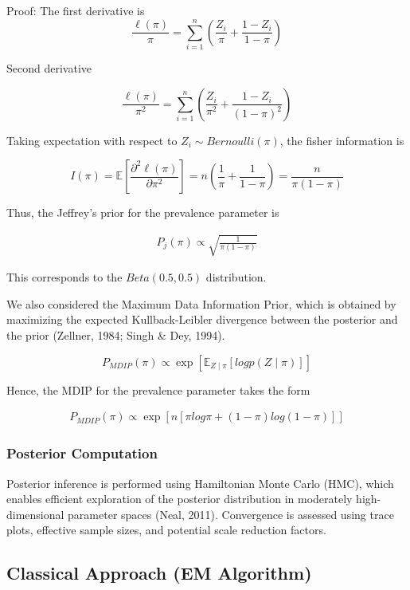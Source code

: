 \documentclass[11pt]{article}
\begin{document}
Proof: The first derivative is 
\[
\frac{\ell(\pi)}{\pi} = \sum_{i = 1}^{n} \left(  \frac{Z_i}{\pi} + \frac{1 - Z_i}{1 - \pi}
\right)
\]

Second derivative

\[
\frac{\ell(\pi)}{\pi^2} = \sum_{i = 1}^{n} \left(  \frac{Z_i}{\pi^2} + \frac{1 - Z_i}{(1 - \pi)^2}
\right)
\]

Taking expectation with respect to $Z_i \sim Bernoulli(\pi)$, the fisher information is


\[
I(\pi) = \mathbb{E} \left[\frac{\partial^2 \ell(\pi)}{\partial \pi ^2}\right] = n\left(\frac{1}{\pi} + \frac{1}{1 - \pi}\right) = \frac{n}{\pi (1 - \pi)}
\]

Thus, the Jeffrey's prior for the prevalence parameter is 

\begin{align}
	P_j (\pi) \propto \sqrt{\frac{1}{\pi (1- \pi)}}
\end{align}

This corresponds to the $Beta (0.5, 0.5)$ distribution.

We also considered the Maximum Data Information Prior, which is obtained by maximizing the expected Kullback-Leibler divergence between the posterior and the prior (Zellner, 1984; Singh \& Dey, 1994). 

\[
P_{MDIP} (\pi) \propto \exp \left[\mathbb{E}_{Z\mid\pi}[log p (Z \mid \pi)]\right]
\]


Hence, the MDIP for the prevalence parameter takes the form

\begin{align}
P_{MDIP}(\pi) \propto \exp \left[n[\pi log \pi + ( 1- \pi) log(1 - \pi)]\right]
\end{align}

\subsubsection*{\textbf{Posterior Computation}}

Posterior inference is performed using Hamiltonian Monte Carlo (HMC), which enables efficient exploration of the posterior distribution in moderately high-dimensional parameter spaces (Neal, 2011). Convergence is assessed using trace plots, effective sample sizes, and potential scale reduction factors.


\subsection{Classical Approach (EM Algorithm)}
\end{document}
